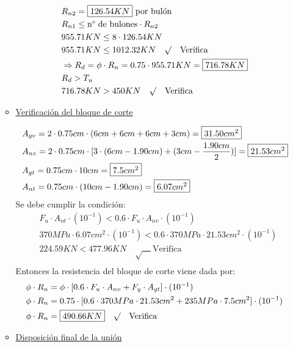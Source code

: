 \begin{enumerate}
\begin{itemize}
\begin{align*}
& R_{n2} = \framebox{$126.54 KN$} \text{ por bulón}\\
& R_{n1} \leq \text{n° de bulones} \cdot R_{n2}\\
& 955.71 KN \leq 8 \cdot 126.54 KN\\
& 955.71 KN \leq 1012.32 KN \quad \surd \quad \text{Verifica}\\
& \Rightarrow R_d = \phi \cdot R_n = 0.75 \cdot 955.71 KN = \framebox{$716.78 KN$}\\
& R_d > T_u\\
& 716.78 KN > 450 KN \quad \surd \quad \text{Verifica}
\end{align*}

\item \underline{Verificación del bloque de corte}

\begin{align*}
& A_{gv} = 2 \cdot 0.75cm \cdot (6cm + 6cm + 6cm + 3cm) = \framebox{$31.50 cm^2$}\\
& A_{nv} = 2 \cdot 0.75cm \cdot [3 \cdot (6cm - 1.90cm) + (3cm - \frac{1.90cm}{2})] = \framebox{$21.53 cm^2$}\\
& A_{gt} = 0.75cm \cdot 10cm = \framebox{$7.5 cm^2$}\\
& A_{nt} = 0.75cm \cdot (10cm - 1.90cm) = \framebox{$6.07 cm^2$}
\end{align*}
Se debe cumplir la condición:
\begin{align*}
& F_u \cdot A_{nt} \cdot (10^{-1}) < 0.6 \cdot F_u \cdot A_{nv} \cdot (10^{-1})\\
& 370MPa \cdot 6.07 cm^2 \cdot (10^{-1}) < 0.6 \cdot 370MPa \cdot 21.53 cm^2 \cdot (10^{-1})\\
& 224.59KN < 477.96KN \quad \surd \quad \text{Verifica}\\
\end{align*}
Entonces la resistencia del bloque de corte viene dada por:
\begin{align*}
& \phi \cdot R_n = \phi \cdot [0.6 \cdot F_u \cdot A_{nv} + F_y \cdot A_{gt}]\cdot (10^{-1})\\
& \phi \cdot R_n = 0.75 \cdot [0.6 \cdot 370MPa \cdot 21.53 cm^2 + 235MPa \cdot 7.5 cm^2]\cdot (10^{-1})\\
& \phi \cdot R_n = \framebox{$490.66 KN$} \quad \surd \quad \text{Verifica}
\end{align*}

\item \underline{Disposición final de la unión}


\end{itemize}
\end{enumerate}
